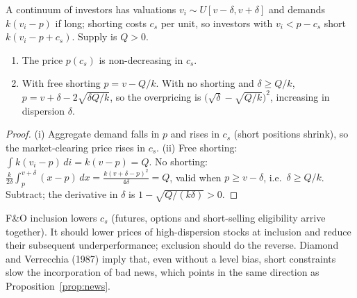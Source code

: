 \begin{proposition}\label{prop:miller}
A continuum of investors has valuations $v_i\sim U[v-\delta,v+\delta]$ and demands $k(v_i-p)$ if long; shorting costs $c_s$
per unit, so investors with $v_i<p-c_s$ short $k(v_i-p+c_s)$. Supply is $Q>0$.
\begin{enumerate}[label=(\roman*),leftmargin=1.8em,itemsep=1pt]
\item The price $p(c_s)$ is non-decreasing in $c_s$.
\item With free shorting $p=v-Q/k$. With no shorting and $\delta\ge Q/k$, $p=v+\delta-2\sqrt{\delta Q/k}$, so the
overpricing is $\big(\sqrt{\delta}-\sqrt{Q/k}\big)^2$, increasing in dispersion $\delta$.
\end{enumerate}
\end{proposition}
\begin{proof}
(i) Aggregate demand falls in $p$ and rises in $c_s$ (short positions shrink), so the market-clearing price rises in $c_s$.
(ii) Free shorting: $\int k(v_i-p)\,di=k(v-p)=Q$. No shorting: $\frac{k}{2\delta}\int_p^{v+\delta}(x-p)\,dx=\frac{k(v+\delta-p)^2}{4\delta}=Q$,
valid when $p\ge v-\delta$, i.e.\ $\delta\ge Q/k$. Subtract; the derivative in $\delta$ is $1-\sqrt{Q/(k\delta)}>0$.
\end{proof}
\begin{emcontent}
F\&O inclusion lowers $c_s$ (futures, options and short-selling eligibility arrive together). It should lower
prices of high-dispersion stocks at inclusion and reduce their subsequent underperformance; exclusion should do the
reverse. Diamond and Verrecchia (1987) imply that, even without a level bias, short constraints slow the incorporation of
bad news, which points in the same direction as Proposition~\ref{prop:news}.
\end{emcontent}

